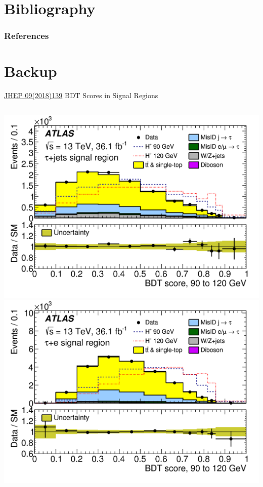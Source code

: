 \documentclass[aspectratio=169,xcolor=table]{beamer}
\begin{document}
\section{Bibliography }

  \begin{frame}[allowframebreaks]
          \frametitle{References}
          \printbibliography
  \end{frame}

\section{Backup }
  
  \begin{frame}[t]{\href{https://link.springer.com/article/10.1007/JHEP09(2018)139}{JHEP 09(2018)139} BDT Scores in Signal Regions}
    \begin{columns}[t]
      \includegraphics[height=.4\textheight,keepaspectratio=true]{taujet_SR_2018/taujet_SR_90to120_2018.png}
      \includegraphics[height=.4\textheight,keepaspectratio=true]{tauel_SR_2018/tauel_SR_90to120_2018.png}


\end{columns}
\end{frame}
\end{document}
